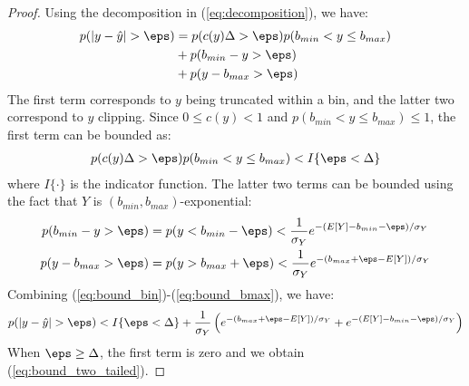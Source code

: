 \documentclass[]{article}
\begin{document}
\begin{proof}
Using the decomposition in (\ref{eq:decomposition}), we have:
\begin{align} \label{eq:decomp_proba}
    p(|y - \hat{y}| > \eps)
                            &= p(c(y)\Delta > \eps)p(b_{min} < y \le b_{max}) \nonumber \\
                            &+ p(b_{min} - y > \eps) \\
                            &+ p(y - b_{max} > \eps) \nonumber
\end{align}
The first term corresponds to $y$ being truncated within a bin, and the latter two correspond to $y$ clipping. Since $0 \le c(y) < 1$ and $p(b_{min} < y \le b_{max}) \le 1$, the first term can be bounded as:
\begin{align}
    p(c(y)\Delta > \eps)p(b_{min} < y \le b_{max}) < I\{\eps < \Delta\} \label{eq:bound_bin}
\end{align}
where $I\{\cdot\}$ is the indicator function. The latter two terms can be bounded using the fact that $Y$ is $(b_{min}, b_{max})$-exponential:
\begin{align}
    p(b_{min} - y > \eps) &= p(y < b_{min} - \eps) < \frac{1}{\sigma_Y} e^{-(E[Y] - b_{min} - \eps) / \sigma_Y} \\
    p(y - b_{max} > \eps) &= p(y > b_{max} + \eps) < \frac{1}{\sigma_Y} e^{-(b_{max} + \eps - E[Y]) / \sigma_Y} \label{eq:bound_bmax}
\end{align}
Combining (\ref{eq:bound_bin})-(\ref{eq:bound_bmax}), we have:
\begin{align}
    p(|y - \hat{y}| > \eps) < I\{\eps < \Delta\} +
                            \frac{1}{\sigma_Y} \left(
                                e^{-(b_{max} + \eps - E[Y]) / \sigma_Y}
                                + e^{-(E[Y] - b_{min} - \eps) / \sigma_Y}
                            \right)
\end{align}
When $\eps \ge \Delta$, the first term is zero and we obtain (\ref{eq:bound_two_tailed}).
\end{proof}
\end{document}
